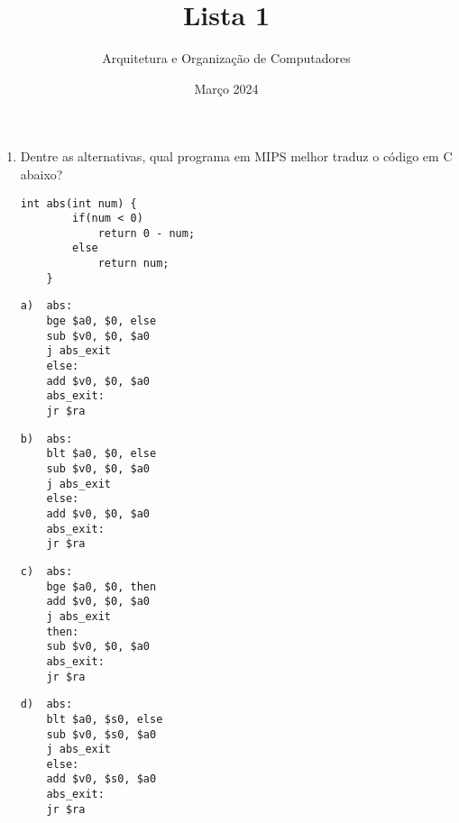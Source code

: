 \documentclass{article}
\title{\Huge Lista 1}
\author{\Large Arquitetura e Organização de Computadores}
\date{Março 2024}
\begin{document}
\maketitle

\begin{enumerate}

\item \large Dentre as alternativas, qual programa em MIPS melhor traduz o código em C abaixo?

\begin{center}
    \begin{minipage}{0.5\textwidth}
        \begin{lstlisting}[frame=single]
    int abs(int num) {
        if(num < 0)
            return 0 - num;
        else
            return num;
    }
        \end{lstlisting}
    \end{minipage}
\end{center}

\begin{minipage}{0.4\textwidth}
    \begin{lstlisting}[frame=single]
a)  abs:
    bge $a0, $0, else
    sub $v0, $0, $a0
    j abs_exit
    else:
    add $v0, $0, $a0
    abs_exit:
    jr $ra
    \end{lstlisting}%
\end{minipage}
\hspace{1cm}
\begin{minipage}{0.4\textwidth}
    \begin{lstlisting}[frame=single]
b)  abs:
    blt $a0, $0, else
    sub $v0, $0, $a0
    j abs_exit
    else:
    add $v0, $0, $a0
    abs_exit:
    jr $ra
    \end{lstlisting}
\end{minipage}

\bigskip

\begin{minipage}{0.4\textwidth}
    \begin{lstlisting}[frame=single]
c)  abs:
    bge $a0, $0, then
    add $v0, $0, $a0
    j abs_exit
    then:
    sub $v0, $0, $a0
    abs_exit:
    jr $ra
    \end{lstlisting}
\end{minipage}
\hspace{1cm}
\begin{minipage}{0.4\textwidth}
    \begin{lstlisting}[frame=single]
d)  abs:
    blt $a0, $s0, else
    sub $v0, $s0, $a0
    j abs_exit
    else:
    add $v0, $s0, $a0
    abs_exit:
    jr $ra
    \end{lstlisting}
\end{minipage}


\end{enumerate}
\end{document}
